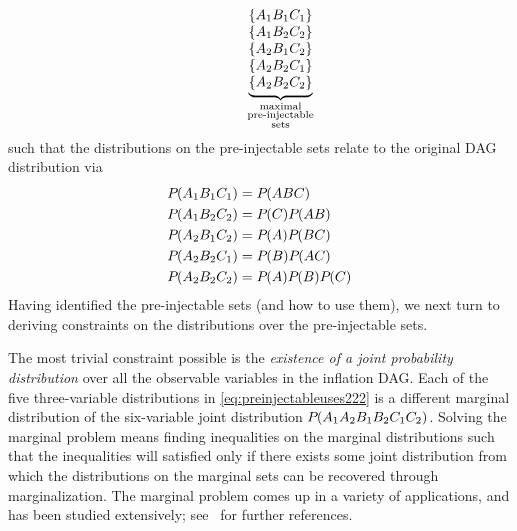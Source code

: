 {\begin{align}
\qquad\quad
{\underbrace{\begin{matrix}
\\
\left\lbrace A_1 B_1 C_1\right\rbrace \\
\left\lbrace A_1 B_2 C_2\right\rbrace \\
\left\lbrace A_2 B_1 C_2\right\rbrace \\
\left\lbrace A_2 B_2 C_1\right\rbrace \\
\left\lbrace A_2 B_2 C_2\right\rbrace
\end{matrix}}_{\substack{\text{maximal}\\\text{pre-injectable}\\\text{sets}}}}
\end{align}
such that the distributions on the pre-injectable sets relate to the original DAG distribution via
\begin{align}\label{eq:preinjectableuses222}
\begin{split}
&{P_{}}\lparen A_1 B_1 C_1\rparen = {P_{}}\lparen A B C\rparen \\
&{P_{}}\lparen A_1 B_2 C_2\rparen = {P_{}}\lparen C\rparen{P_{}}\lparen A B\rparen\\
&{P_{}}\lparen A_2 B_1 C_2\rparen = {P_{}}\lparen A\rparen{P_{}}\lparen B C\rparen\\
&{P_{}}\lparen A_2 B_2 C_1\rparen = {P_{}}\lparen B\rparen{P_{}}\lparen A C\rparen\\
&{P_{}}\lparen A_2 B_2 C_2\rparen = {P_{}}\lparen A\rparen{P_{}}\lparen B\rparen{P_{}}\lparen C\rparen
\end{split}
\end{align}
Having identified the pre-injectable sets (and how to use them), we next turn to deriving constraints on the distributions over the pre-injectable sets.


\label{step:marginalsproblem}\par\smallskip\nobreak

The most trivial constraint possible 
is the \emph{existence of a joint probability distribution} over all the observable variables in the inflation DAG. Each of the five three-variable distributions in \cref{eq:preinjectableuses222} is a different marginal distribution of the six-variable joint distribution ${P_{}}\lparen A_1 A_2 B_1 B_2 C_1 C_2\rparen$. Solving the marginal problem means finding inequalities on the marginal distributions such that the inequalities will satisfied only if there exists some joint distribution from which the distributions on the marginal sets can be recovered through marginalization. The marginal problem comes up in a variety of applications, and has been studied extensively; see~\cite{fritz2013marginal} for further references.  

}
